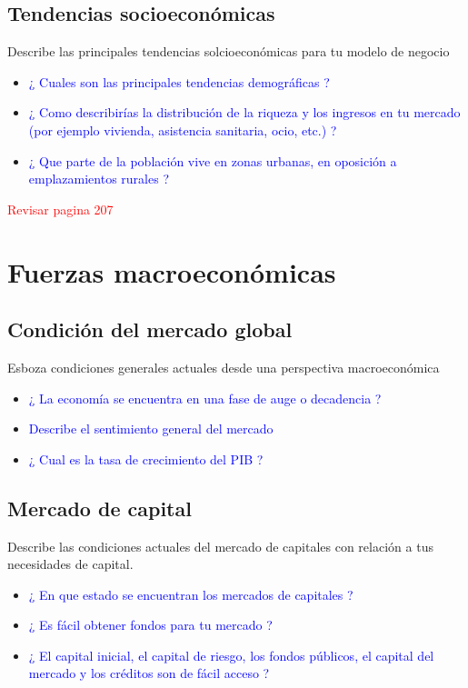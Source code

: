 \documentclass[11pt]{book}
\begin{document}
\subsection{Tendencias socioeconómicas}
Describe las principales tendencias solcioeconómicas para tu modelo de negocio
\begin{itemize}
\item\textcolor{blue}{ ¿ Cuales son las principales tendencias demográficas ? }
\item\textcolor{blue}{ ¿ Como describirías la distribución de la riqueza y los ingresos en tu mercado (por ejemplo vivienda, asistencia sanitaria, ocio, etc.) ? }
\item\textcolor{blue}{ ¿ Que parte de la población vive en zonas urbanas, en oposición a emplazamientos rurales ? }
\end{itemize}
\textcolor{red}{ Revisar pagina 207 }
\section{Fuerzas macroeconómicas}
\subsection{Condición del mercado global}
Esboza condiciones generales actuales desde una perspectiva macroeconómica
\begin{itemize}
\item\textcolor{blue}{ ¿ La economía se encuentra en una fase de auge o decadencia ? }
\item\textcolor{blue}{ Describe el sentimiento general del mercado }
\item\textcolor{blue}{ ¿ Cual es la tasa de crecimiento del PIB ? }
\end{itemize}
\subsection{Mercado de capital}
Describe las condiciones actuales del mercado de capitales con relación a tus necesidades de capital.
\begin{itemize}
\item\textcolor{blue}{ ¿ En que estado se encuentran los mercados de capitales ? }
\item\textcolor{blue}{ ¿ Es fácil obtener fondos para tu mercado ? }
\item\textcolor{blue}{ ¿ El capital inicial, el capital de riesgo, los fondos públicos, el capital del mercado y los créditos son de fácil acceso ? }
\end{itemize}
\end{document}
